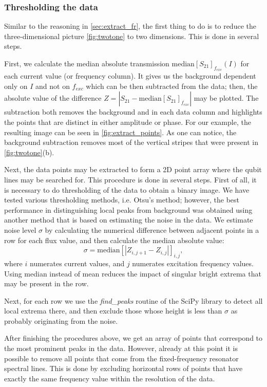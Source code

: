 \documentclass[%
 aip,
 amsmath,amssymb,
 reprint,%
]{revtex4-1}
\begin{document}
\subsubsection{Thresholding the data}

Similar to the reasoning in \autoref{sec:extract_fr}, the first thing to do is to reduce the three-dimensional picture \autoref{fig:twotone} to two dimensions. This is done in several steps.

First, we calculate the median absolute transmission $\text{median} [S_{21}]_{f_{exc}} (I)$ for each current value (or frequency column). It gives us the background dependent only on $I$ and not on  $ f_{exc} $ which can be then subtracted from the data; then, the absolute value of the difference $ Z = \left| S_{21} - \text{median} [S_{21}]_{f_{exc}} \right |$ may be plotted. The subtraction both removes the background and in each data column and highlights the points that are distinct in either amplitude or phase. For our example, the resulting image can be seen in \autoref{fig:extract_points}. As one can notice, the background subtraction removes most of the vertical stripes that were present in \autoref{fig:twotone}(b).

Next, the data points may be extracted to form a 2D point array where the qubit lines may be searched for. This procedure is done in several steps. First of all, it is necessary to do thresholding of the data to obtain a binary image. We have tested various thresholding methods, i.e. Otsu's method\cite{otsu1979}; however, the best performance in distinguishing local peaks from background was obtained using another method that is based on estimating the noise in the data. We estimate noise level $\sigma$ by calculating the numerical difference between adjacent points in a row for each flux value, and then calculate the median absolute value: 
\[
\sigma = \text{median}\left[ \left| Z_{i,j+1} - Z_{i,j} \right| \right]_{i,j},
\]
where $i$ numerates current values, and $j$ numerates excitation frequency values. Using median instead of mean reduces the impact of singular bright extrema that may be present in the row.

Next, for each row we use the \textit{find\_peaks} routine of the SciPy\cite{scipy} library to detect all local extrema there, and then exclude those whose height is less than $\sigma$ as probably originating from the noise.

After finishing the procedures above, we get an array of points that correspond to the most prominent peaks in the data. However, already at this point it is possible to remove all points that come from the fixed-frequency resonator spectral lines. This is done by excluding horizontal rows of points that have exactly the same frequency value within the resolution of the data.
\end{document}
